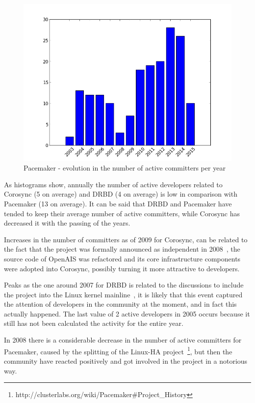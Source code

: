 \documentclass[a4paper, 12pt]{book}
\begin{document}
    \begin{figure}[H]
      \centering
      \includegraphics[scale=0.45]{barchart_p.png}
      \caption[Active committers for Pacemaker]{Pacemaker - evolution in the number of active committers per year}
      \label{fig:barchart_p}
    \end{figure}


\noindent As histograms show, annually the number of active developers related to Corosync (5 on average) and DRBD (4 on average) is low in comparison with Pacemaker (13 on average). It can be said that DRBD and Pacemaker have tended to keep their average number of active committers, while Corosync has decreased it with the passing of the years.\bigskip

\noindent Increases in the number of committers as of 2009 for Corosync, can be related to the fact that the project was formally announced as independent in 2008~\cite{CRS}, the source code of OpenAIS was refactored and its core infrastructure components were adopted into Corosync, possibly turning it more attractive to developers.\bigskip

\noindent Peaks as the one around 2007 for DRBD is related to the discussions to include the project into the Linux kernel mainline~\cite{ELDRBD}, it is likely that this event captured the attention of developers in the community at the moment, and in fact this actually happened. The last value of 2 active developers in 2005 occurs because it still has not been calculated the activity for the entire year.\bigskip

\noindent In 2008 there is a considerable decrease in the number of active committers for Pacemaker, caused by the splitting of the Linux-HA project~\footnote{http://clusterlabs.org/wiki/Pacemaker\#Project\_History}, but then the community have reacted positively and got involved in the project in a notorious way.\bigskip
\end{document}
